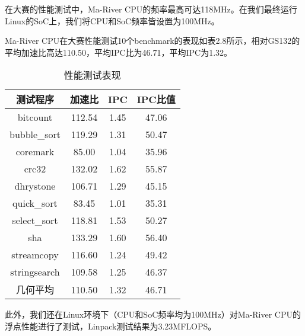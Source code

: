 在大赛的性能测试中，Ma-River CPU的频率最高可达118MHz。在我们最终运行Linux的SoC上，我们将CPU和SoC频率皆设置为100MHz。

Ma-River CPU在大赛性能测试10个benchmark的表现如表2.8所示，相对GS132的平均加速比高达110.50，平均IPC比为46.71，平均IPC为1.32。

\begin{table}[htbp]
\centering
\caption{性能测试表现}
\label{fig:enter-label}
\begin{tabular}{c|c|c|c}
\hline  %
\textbf{测试程序} & \textbf{加速比} & \textbf{IPC} & \textbf{IPC比值}\\
\hline
bitcount & 112.54 & 1.45 & 47.06 \\
bubble\_sort & 119.29 & 1.31 & 50.47\\
coremark & 85.00 & 1.04 & 35.96\\
crc32 & 132.02 & 1.62 & 55.87\\
dhrystone & 106.71 & 1.29 & 45.15\\
quick\_sort & 83.45 & 1.01 & 35.31\\
select\_sort & 118.81 & 1.53 & 50.27\\
sha & 133.29 & 1.60 & 56.40\\
streamcopy & 116.60 & 1.24 & 49.42\\
stringsearch & 109.58 & 1.25 & 46.37\\
几何平均 & 110.50 & 1.32 & 46.71\\
\hline
\end{tabular}

\end{table}

此外，我们还在Linux环境下（CPU和SoC频率均为100MHz）对Ma-River CPU的浮点性能进行了测试，Linpack测试结果为3.23MFLOPS。